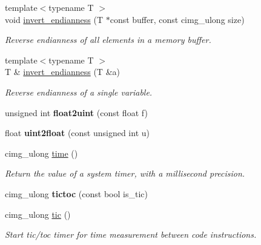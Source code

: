 \begin{DoxyCompactItemize}
{\footnotesize template$<$typename T $>$ }\\void \hyperlink{namespacecimg__library__suffixed_1_1cimg_a1f8e231e39844ce1685d2fa80edd852d}{invert\+\_\+endianness} (T $\ast$const buffer, const cimg\+\_\+ulong size)
\begin{DoxyCompactList}\small\item\em Reverse endianness of all elements in a memory buffer. \end{DoxyCompactList}\item 
{\footnotesize template$<$typename T $>$ }\\T \& \hyperlink{namespacecimg__library__suffixed_1_1cimg_aaa2e6e8ccab85cc7fc7b9f02060965a2}{invert\+\_\+endianness} (T \&a)
\begin{DoxyCompactList}\small\item\em Reverse endianness of a single variable. \end{DoxyCompactList}\item 
\mbox{\label{namespacecimg__library__suffixed_1_1cimg_abeb336981cf553b3244c800b781e313d}} 
unsigned int {\bfseries float2uint} (const float f)
\item 
\mbox{\label{namespacecimg__library__suffixed_1_1cimg_a6293f332d662f83e39a5a388b5abd222}} 
float {\bfseries uint2float} (const unsigned int u)
\item 
cimg\+\_\+ulong \hyperlink{namespacecimg__library__suffixed_1_1cimg_a71a3c7b37befc7a4313dfcdd80271bce}{time} ()
\begin{DoxyCompactList}\small\item\em Return the value of a system timer, with a millisecond precision. \end{DoxyCompactList}\item 
\mbox{\label{namespacecimg__library__suffixed_1_1cimg_ab47e3a7718b582df77725470f3824eb4}} 
cimg\+\_\+ulong {\bfseries tictoc} (const bool is\+\_\+tic)
\item 
cimg\+\_\+ulong \hyperlink{namespacecimg__library__suffixed_1_1cimg_a5bd41788a0caabcc16754f18b3454321}{tic} ()
\begin{DoxyCompactList}\small\item\em Start tic/toc timer for time measurement between code instructions. \end{DoxyCompactList}\item 

\end{DoxyCompactItemize}
